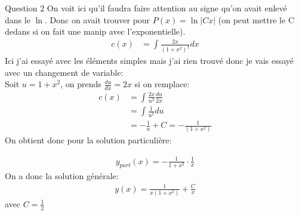 \begin{parag}{Question 2}
On voit ici qu'il faudra faire attention au signe qu'on avait enlevé dans le $\ln$.
Donc on avait trouver pour $P\left(x\right) = \ln \left|Cx\right| $ (on peut mettre le C dedans si on fait une manip avec l'exponentielle).
        \begin{align*} c\left(x\right) &= \int \frac{2x}{\left(1 + x^2\right)^2} dx
        \end{align*}
        Ici j'ai essayé avec les éléments simples mais j'ai rien trouvé donc je vais essayé avec un changement de variable:\\
        Soit $u = 1 + x^2$, on prends $\frac{du}{dx} = 2x$ si on remplace:
            \begin{align*} c\left(x\right) &= \int \frac{2x}{u^2}\frac{du}{2x}\\
            &= \int \frac{1}{u^2}du\\
            &= -\frac{1}{u} + C = -\frac{1}{\left(1 + x^2\right)}
        \end{align*}
        On obtient donc pour la solution particulière:

        \begin{align*} y_{part}\left(x\right) = -\frac{1}{1+x^2}\cdot \frac{1}{x} \end{align*}
On a donc la solution générale:
\begin{align*} y\left(x\right) = \frac{1}{x\left(1+x^2\right)} + \frac{C}{x} \end{align*}
avec $C = \frac{1}{2}$ 

\end{parag}
